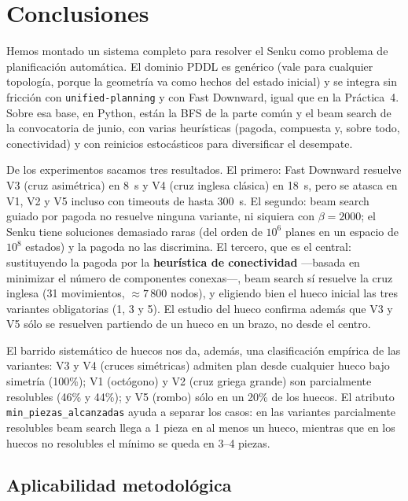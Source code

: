\documentclass[conference,a4paper]{IEEEtran}
\begin{document}
\section{Conclusiones}
\label{sec:conclusiones}

Hemos montado un sistema completo para resolver el Senku como problema
de planificación automática. El dominio PDDL es genérico (vale para
cualquier topología, porque la geometría va como hechos del estado
inicial) y se integra sin fricción con \texttt{unified-planning} y con
Fast Downward, igual que en la Práctica~4. Sobre esa base, en Python,
están la BFS de la parte común y el beam search de la convocatoria de
junio, con varias heurísticas (pagoda, compuesta y, sobre todo,
conectividad) y con reinicios estocásticos para diversificar el
desempate.

De los experimentos sacamos tres resultados. El primero: Fast Downward
resuelve V3 (cruz asimétrica) en 8~s y V4 (cruz inglesa clásica) en
18~s, pero se atasca en V1, V2 y V5 incluso con timeouts de hasta
300~s. El segundo: beam search guiado por pagoda no resuelve ninguna
variante, ni siquiera con $\beta=2000$; el Senku tiene soluciones
demasiado raras (del orden de $10^{6}$ planes en un espacio de $10^{8}$
estados) y la pagoda no las discrimina. El tercero, que es el central:
sustituyendo la pagoda por la \textbf{heurística de conectividad}
---basada en minimizar el número de componentes conexas---, beam search
sí resuelve la cruz inglesa (31 movimientos, $\approx\!7\,800$ nodos),
y eligiendo bien el hueco inicial las tres variantes obligatorias (1, 3
y 5). El estudio del hueco confirma además que V3 y V5 sólo se resuelven
partiendo de un hueco en un brazo, no desde el centro.

El barrido sistemático de huecos nos da, además, una clasificación
empírica de las variantes: V3 y V4 (cruces simétricas) admiten plan
desde cualquier hueco bajo simetría (100\%); V1 (octógono) y V2 (cruz
griega grande) son parcialmente resolubles (46\% y 44\%); y V5 (rombo)
sólo en un 20\% de los huecos. El atributo
\texttt{min\_piezas\_alcanzadas} ayuda a separar los casos: en las
variantes parcialmente resolubles beam search llega a 1 pieza en al
menos un hueco, mientras que en los huecos no resolubles el mínimo
se queda en 3--4 piezas.

\subsection{Aplicabilidad metodológica}
\end{document}
